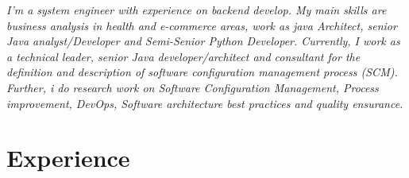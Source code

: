 \documentclass[american]{cv-class}
\begin{document}
\justifying
	\begin{small}
		\textit{
			I'm a system engineer with experience on backend develop. My main skills are business analysis in health and e-commerce areas, work as java Architect, senior Java analyst/Developer and Semi-Senior Python Developer. Currently, I work as a technical leader, senior Java developer/architect and consultant for the definition and description of software configuration management process (SCM). Further, i do research work on Software Configuration Management, Process improvement, DevOps, Software architecture best practices and quality ensurance.
		}
	\end{small}

\section{Experience}
\end{document}
